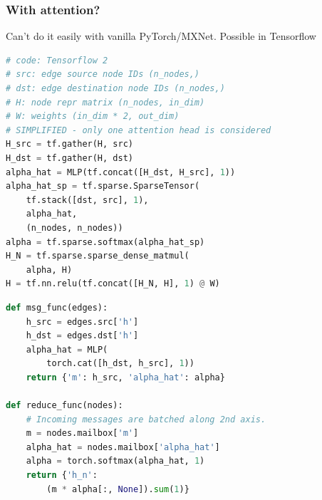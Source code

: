 \documentclass[10pt,aspectratio=169]{beamer}
\begin{document}
	\begin{frame}[fragile]
		\frametitle{With attention?}
		Can't do it easily with vanilla PyTorch/MXNet.  Possible in Tensorflow
		\begin{minipage}{0.5\textwidth}
\begin{lstlisting}[language=Python]
# code: Tensorflow 2
# src: edge source node IDs (n_nodes,)
# dst: edge destination node IDs (n_nodes,)
# H: node repr matrix (n_nodes, in_dim)
# W: weights (in_dim * 2, out_dim)
# SIMPLIFIED - only one attention head is considered
H_src = tf.gather(H, src)
H_dst = tf.gather(H, dst)
alpha_hat = MLP(tf.concat([H_dst, H_src], 1))
alpha_hat_sp = tf.sparse.SparseTensor(
    tf.stack([dst, src], 1),
    alpha_hat,
    (n_nodes, n_nodes))
alpha = tf.sparse.softmax(alpha_hat_sp)
H_N = tf.sparse.sparse_dense_matmul(
    alpha, H)
H = tf.nn.relu(tf.concat([H_N, H], 1) @ W)
\end{lstlisting}
		\end{minipage}%
		\begin{minipage}{0.5\textwidth}
\begin{lstlisting}[language=Python]
def msg_func(edges):
    h_src = edges.src['h']
    h_dst = edges.dst['h']
    alpha_hat = MLP(
        torch.cat([h_dst, h_src], 1))
    return {'m': h_src, 'alpha_hat': alpha}

def reduce_func(nodes):
    # Incoming messages are batched along 2nd axis.
    m = nodes.mailbox['m']
    alpha_hat = nodes.mailbox['alpha_hat']
    alpha = torch.softmax(alpha_hat, 1)
    return {'h_n':
        (m * alpha[:, None]).sum(1)}
\end{lstlisting}
		\end{minipage}
	\end{frame}
\end{document}
